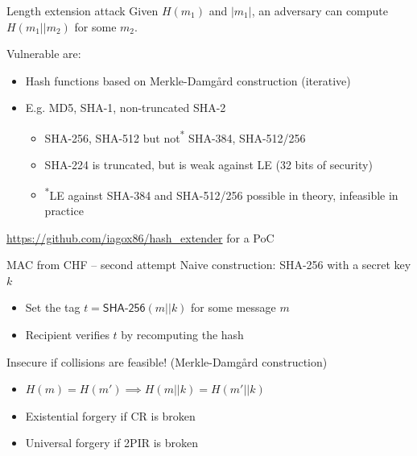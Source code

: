 \begin{frame}{Length extension attack}
  Given $H(m_1)$ and $\lvert m_1\rvert$, an adversary can compute $H(m_1 || m_2)$ for some $m_2$.

  \vspace*{1em}

  \pause
  Vulnerable are:
  \begin{itemize}[<+(1)->]
    \item Hash functions based on Merkle-Damgård construction (iterative)
    \item E.g. MD5, SHA-1, non-truncated SHA-2
    \begin{itemize}
      \item SHA-256, SHA-512 but not\textsuperscript{*} SHA-384, SHA-512/256
      \item SHA-224 is truncated, but is weak against LE (32 bits of security)
      \item \textsuperscript{*}LE against SHA-384 and SHA-512/256 possible in theory, infeasible in practice 
    \end{itemize}
  \end{itemize}

  \pause
  {\scriptsize\url{https://github.com/iagox86/hash_extender} for a PoC}
\end{frame}

\begin{frame}{MAC from CHF -- second attempt}
  Naive construction: SHA-256 with a secret key $k$
  \begin{itemize}
    \item Set the tag $t = \mathsf{SHA\text{-}256}(m||k)$ for some message $m$
    \item Recipient verifies $t$ by recomputing the hash
  \end{itemize}

  \vspace*{1em}

  \pause
  Insecure if collisions are feasible! {\scriptsize(Merkle-Damgård construction)}
  \begin{itemize}[<+(1)->]
    \item $H(m) = H(m') \implies H(m||k) = H(m'||k)$
    \item Existential forgery if CR is broken
    \item Universal forgery if 2PIR is broken
  \end{itemize}
\end{frame}


